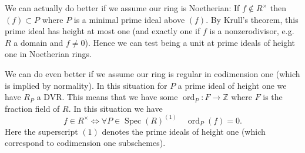 \documentclass[12pt]{article}
\numberwithin{equation}{section}
\theoremstyle{definition}
\theoremstyle{remark}
\newcommand{\ZZ}{\mathbb{Z}}
\newcommand{\Spec}{\operatorname{Spec}}
\newcommand{\ord}{\operatorname{ord}}
\begin{document}
We can actually do better if we assume our ring is Noetherian: If $f \notin R^{\times}$ then $(f) \subset P$ where $P$ is a minimal prime ideal above $(f)$. 
By Krull's theorem, this prime ideal has height at most one (and exactly one if $f$ is a nonzerodivisor, e.g.\ $R$ a domain and $f\neq 0$). 
Hence we can test being a unit at prime ideals of height one in Noetherian rings. 

We can do even better if we assume our ring is regular in codimension one (which is implied by normality). 
In this situation for $P$ a prime ideal of height one we have $R_P$ a DVR. 
This means that we have some $\ord_P: F \to \ZZ$ where $F$ is the fraction field of $R$.
In this situation we have 
$$ f \in R^{\times} \iff \forall P \in \Spec(R)^{(1)} \quad \ord_P(f)=0.$$
Here the superscript $(1)$ denotes the prime ideals of height one (which correspond to codimension one subschemes).
\end{document}
